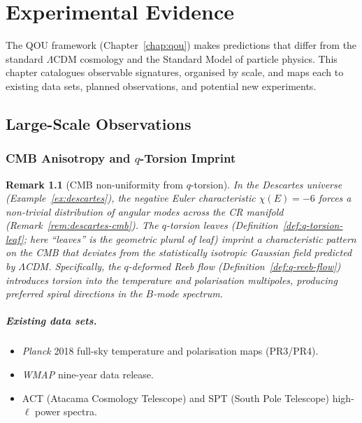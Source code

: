 \documentclass[12pt,a4paper]{report}
\newtheorem{remark}[theorem]{Remark}
\begin{document}
 \chapter{Experimental Evidence}
\label{chap:experimental}

The QOU framework (Chapter~\ref{chap:qou}) makes predictions that differ from
the standard $\Lambda$CDM cosmology and the Standard Model of particle physics.
This chapter catalogues observable signatures, organised by scale, and maps each
to existing data sets, planned observations, and potential new experiments.



\section{Large-Scale Observations}
\label{sec:large-scale}

\subsection{CMB Anisotropy and $q$-Torsion Imprint}
\label{sec:cmb-torsion}

\begin{remark}[CMB non-uniformity from $q$-torsion]
\label{rem:cmb-q-torsion}
In the Descartes universe (Example~\ref{ex:descartes}), the negative Euler
characteristic $\chi(E) = -6$ forces a non-trivial distribution of angular
modes across the CR manifold (Remark~\ref{rem:descartes-cmb}).  The
$q$-torsion leaves (Definition~\ref{def:q-torsion-leaf}; here ``leaves'' is the
geometric plural of \emph{leaf}) imprint a
characteristic pattern on the CMB that deviates from the statistically
isotropic Gaussian field predicted by $\Lambda$CDM\@.  Specifically, the
$q$-deformed Reeb flow (Definition~\ref{def:q-reeb-flow}) introduces
\emph{torsion} into the temperature and polarisation multipoles, producing
preferred spiral directions in the $B$-mode spectrum.
\end{remark}

\paragraph{Existing data sets.}
\begin{itemize}
  \item \emph{Planck} 2018 full-sky temperature and polarisation maps
        (PR3/PR4).
  \item \emph{WMAP} nine-year data release.
  \item ACT (Atacama Cosmology Telescope) and SPT (South Pole Telescope)
        high-$\ell$ power spectra.
\end{itemize}
\end{document}

